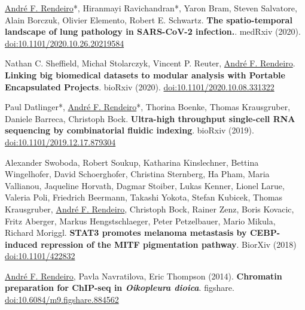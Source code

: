 \documentclass[11pt,a4paper,roman]{moderncv} %
\begin{document}
        \begin{etaremune}[leftmargin=1.0cm, itemindent=0pt, topsep=10pt, itemsep=2pt, partopsep=0pt, parsep=0pt]

        \item \underline{André F. Rendeiro}*, Hiranmayi Ravichandran*, Yaron Bram, Steven Salvatore, Alain Borczuk, Olivier Elemento, Robert E. Schwartz. \textbf{The spatio-temporal landscape of lung pathology in SARS-CoV-2 infection.}. medRxiv (2020). \href{https://dx.doi.org/10.1101/2020.10.26.20219584}{doi:10.1101/2020.10.26.20219584}

        \item Nathan C. Sheffield, Michał Stolarczyk, Vincent P. Reuter, \underline{André F. Rendeiro}. \textbf{Linking big biomedical datasets to modular analysis with Portable Encapsulated Projects}. bioRxiv (2020). \href{https://dx.doi.org/10.1101/2020.10.08.331322}{doi:10.1101/2020.10.08.331322}

        \item Paul Datlinger*, \underline{André F. Rendeiro}*, Thorina Boenke, Thomas Krausgruber, Daniele Barreca, Christoph Bock. \textbf{Ultra-high throughput single-cell RNA sequencing by combinatorial fluidic indexing}. bioRxiv (2019). \href{https://dx.doi.org/10.1101/2019.12.17.879304}{doi:10.1101/2019.12.17.879304}
        \item Alexander Swoboda, Robert Soukup, Katharina Kinslechner, Bettina Wingelhofer, David Schoerghofer, Christina Sternberg, Ha Pham, Maria Vallianou, Jaqueline Horvath, Dagmar Stoiber, Lukas Kenner, Lionel Larue, Valeria Poli, Friedrich Beermann, Takashi Yokota, Stefan Kubicek, Thomas Krausgruber, \underline{André F. Rendeiro}, Christoph Bock, Rainer Zenz, Boris Kovacic, Fritz Aberger, Markus Hengstschlaeger, Peter Petzelbauer, Mario Mikula, Richard Moriggl. \textbf{STAT3 promotes melanoma metastasis by CEBP-induced repression of the MITF pigmentation pathway}. BiorXiv (2018) \href{https://dx.doi.org/ 10.1101/422832}{doi:10.1101/422832}

        \item \underline{André F. Rendeiro}, Pavla  Navratilova, Eric Thompson (2014). \textbf{Chromatin preparation for ChIP-seq in \textit{Oikopleura dioica}}. figshare. \href{https://doi.org/10.6084/m9.figshare.884562}{doi:10.6084/m9.figshare.884562}
        \end{etaremune}
\end{document}
